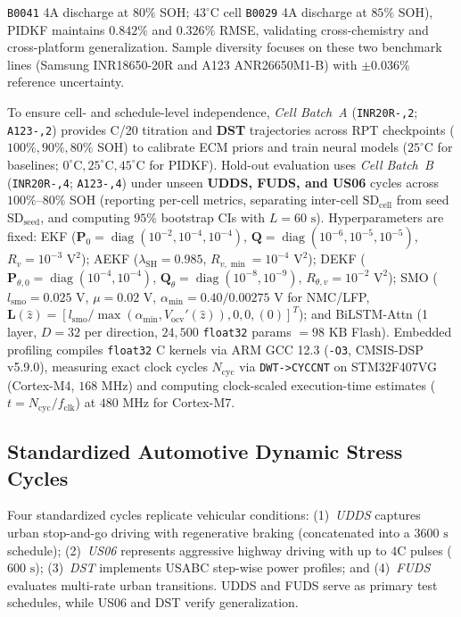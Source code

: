\documentclass[balance,nocopyright,upint,varvw,hyphenate,barcolor=NavyBlue,nolists]{asmejour}
\begin{document}
\texttt{B0041} 4A discharge at $80\%$ SOH; $43^\circ\text{C}$ cell \texttt{B0029} 4A discharge at $85\%$ SOH), PIDKF maintains $0.842\%$ and $0.326\%$ RMSE, validating cross-chemistry and cross-platform generalization. Sample diversity focuses on these two benchmark lines (Samsung INR18650-20R and A123 ANR26650M1-B) with $\pm 0.036\%$ reference uncertainty.

To ensure cell- and schedule-level independence, \emph{Cell Batch~A} (\texttt{INR20R-,2}; \texttt{A123-,2}) provides C/20 titration and \textbf{DST} trajectories across RPT checkpoints ($100\%, \allowbreak 90\%, \allowbreak 80\%$ SOH) to calibrate ECM priors and train neural models ($25^\circ\text{C}$ for baselines; $0^\circ\text{C}, \allowbreak 25^\circ\text{C}, \allowbreak 45^\circ\text{C}$ for PIDKF). Hold-out evaluation uses \emph{Cell Batch~B} (\texttt{INR20R-,4}; \texttt{A123-,4}) under unseen \textbf{UDDS, FUDS, and US06} cycles across $100\%\text{--}80\%$ SOH (reporting per-cell metrics, separating inter-cell $\text{SD}_{\text{cell}}$ from seed $\text{SD}_{\text{seed}}$, and computing $95\%$ bootstrap CIs with $L=60\text{ s}$). Hyperparameters are fixed: EKF ($\mathbf{P}_0 = \allowbreak\operatorname{diag}(10^{-2}, \allowbreak 10^{-4}, \allowbreak 10^{-4})$, $\mathbf{Q} = \allowbreak\operatorname{diag}(10^{-6}, \allowbreak 10^{-5}, \allowbreak 10^{-5})$, $R_v = \allowbreak 10^{-3}\text{ V}^2$); AEKF ($\lambda_{\text{SH}} = 0.985$, $R_{v,\min} = \allowbreak 10^{-4}\text{ V}^2$); DEKF ($\mathbf{P}_{\theta,0} = \allowbreak\operatorname{diag}(10^{-4}, \allowbreak 10^{-4})$, $\mathbf{Q}_\theta = \allowbreak\operatorname{diag}(10^{-8}, \allowbreak 10^{-9})$, $R_{\theta,v} = \allowbreak 10^{-2}\text{ V}^2$); SMO ($l_{\text{smo}} = 0.025\text{ V}$, $\mu = 0.02\text{ V}$, $\alpha_{\min} = 0.40/0.00275\text{ V}$ for NMC/LFP, $\mathbf{L}(\hat{z}) = [l_{\text{smo}}/\max(\alpha_{\min}, V_{\text{ocv}}'(\hat{z})), 0, 0, (0)]^T$); and BiLSTM-Attn (1 layer, $D=32$ per direction, $24,500$ \texttt{float32} params $= 98\text{ KB}$ Flash). Embedded profiling compiles \texttt{float32} C kernels via ARM GCC 12.3 (\texttt{-O3}, CMSIS-DSP v5.9.0), measuring exact clock cycles $N_{\text{cyc}}$ via \texttt{DWT-}\allowbreak\texttt{>CYCCNT} on STM32F407VG (Cortex-M4, $168\text{ MHz}$) and computing clock-scaled execution-time estimates ($t = \allowbreak N_{\text{cyc}}/f_{\text{clk}}$) at $480\text{ MHz}$ for Cortex-M7.

\subsection{Standardized Automotive Dynamic Stress Cycles}
Four standardized cycles replicate vehicular conditions: (1)~\emph{UDDS} captures urban stop-and-go driving with regenerative braking (concatenated into a $3600\text{ s}$ schedule); (2)~\emph{US06} represents aggressive highway driving with up to $4\text{C}$ pulses ($600\text{ s}$); (3)~\emph{DST} implements USABC step-wise power profiles; and (4)~\emph{FUDS} evaluates multi-rate urban transitions. UDDS and FUDS serve as primary test schedules, while US06 and DST verify generalization.
\end{document}
